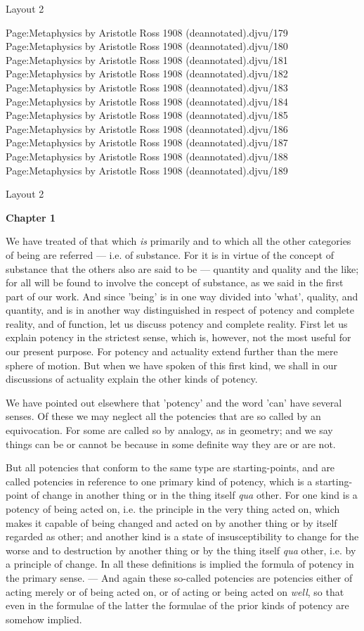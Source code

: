 
Layout 2

Page:Metaphysics by Aristotle Ross 1908 (deannotated).djvu/179 Page:Metaphysics by Aristotle Ross 1908 (deannotated).djvu/180 Page:Metaphysics by Aristotle Ross 1908 (deannotated).djvu/181 Page:Metaphysics by Aristotle Ross 1908 (deannotated).djvu/182 Page:Metaphysics by Aristotle Ross 1908 (deannotated).djvu/183 Page:Metaphysics by Aristotle Ross 1908 (deannotated).djvu/184 Page:Metaphysics by Aristotle Ross 1908 (deannotated).djvu/185 Page:Metaphysics by Aristotle Ross 1908 (deannotated).djvu/186 Page:Metaphysics by Aristotle Ross 1908 (deannotated).djvu/187 Page:Metaphysics by Aristotle Ross 1908 (deannotated).djvu/188 Page:Metaphysics by Aristotle Ross 1908 (deannotated).djvu/189


Layout 2

\textbf{Chapter 1}

We have treated of that which \emph{is} primarily and to which all the other categories of being are referred — i.e. of substance. For it is in virtue of the concept of substance that the others also are said to be — quantity and quality and the like; for all will be found to involve the concept of substance, as we said in the first part of our work. And since 'being' is in one way divided into 'what', quality, and quantity, and is in another way distinguished in respect of potency and complete reality, and of function, let us discuss potency and complete reality. First let us explain potency in the strictest sense, which is, however, not the most useful for our present purpose. For potency and actuality extend further than the mere sphere of motion. But when we have spoken of this first kind, we shall in our discussions of actuality explain the other kinds of potency.

We have pointed out elsewhere that 'potency' and the word 'can' have several senses. Of these we may neglect all the potencies that are so called by an equivocation. For some are called so by analogy, as in geometry; and we say things can be or cannot be because in some definite way they are or are not.

But all potencies that conform to the same type are starting-points, and are called potencies in reference to one primary kind of potency, which is a starting-point of change in another thing or in the thing itself \emph{qua} other. For one kind is a potency of being acted on, i.e. the principle in the very thing acted on, which makes it capable of being changed and acted on by another thing or by itself regarded as other; and another kind is a state of insusceptibility to change for the worse and to destruction by another thing or by the thing itself \emph{qua} other, i.e. by a principle of change. In all these definitions is implied the formula of potency in the primary sense. — And again these so-called potencies are potencies either of acting merely or of being acted on, or of acting or being acted on \emph{well}, so that even in the formulae of the latter the formulae of the prior kinds of potency are somehow implied.

